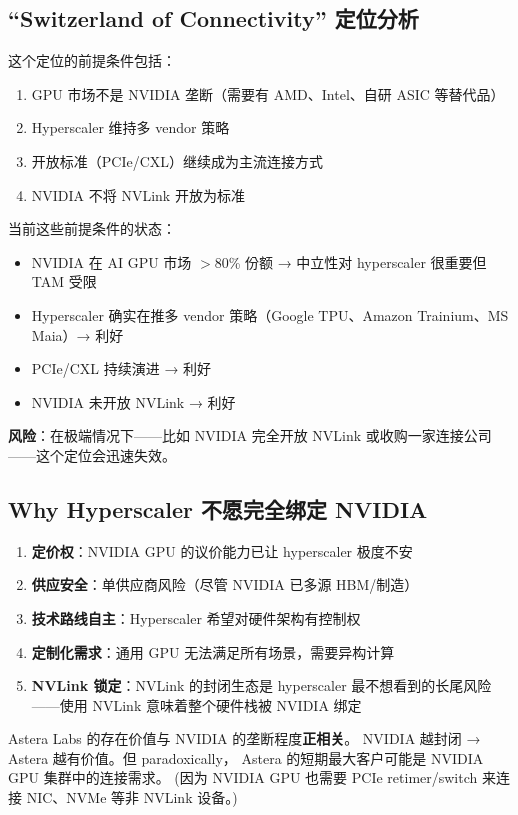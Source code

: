 \subsection{``Switzerland of Connectivity'' 定位分析}

这个定位的前提条件包括：
\begin{enumerate}
    \item GPU 市场不是 NVIDIA 垄断（需要有 AMD、Intel、自研 ASIC 等替代品）
    \item Hyperscaler 维持多 vendor 策略
    \item 开放标准（PCIe/CXL）继续成为主流连接方式
    \item NVIDIA 不将 NVLink 开放为标准
\end{enumerate}

当前这些前提条件的状态：
\begin{itemize}
    \item NVIDIA 在 AI GPU 市场 $>$80\% 份额 → 中立性对 hyperscaler 很重要但 TAM 受限
    \item Hyperscaler 确实在推多 vendor 策略（Google TPU、Amazon Trainium、MS Maia）→ 利好
    \item PCIe/CXL 持续演进 → 利好
    \item NVIDIA 未开放 NVLink → 利好
\end{itemize}

\textbf{风险}：在极端情况下——比如 NVIDIA 完全开放 NVLink 或收购一家连接公司——这个定位会迅速失效。

\subsection{Why Hyperscaler 不愿完全绑定 NVIDIA}

\begin{enumerate}
    \item \textbf{定价权}：NVIDIA GPU 的议价能力已让 hyperscaler 极度不安
    \item \textbf{供应安全}：单供应商风险（尽管 NVIDIA 已多源 HBM/制造）
    \item \textbf{技术路线自主}：Hyperscaler 希望对硬件架构有控制权
    \item \textbf{定制化需求}：通用 GPU 无法满足所有场景，需要异构计算
    \item \textbf{NVLink 锁定}：NVLink 的封闭生态是 hyperscaler 最不想看到的长尾风险——使用 NVLink 意味着整个硬件栈被 NVIDIA 绑定
\end{enumerate}

Astera Labs 的存在价值与 NVIDIA 的垄断程度\textbf{正相关}。
NVIDIA 越封闭 → Astera 越有价值。但 paradoxically，
Astera 的短期最大客户可能是 NVIDIA GPU 集群中的连接需求。
(因为 NVIDIA GPU 也需要 PCIe retimer/switch 来连接 NIC、NVMe 等非 NVLink 设备。)
